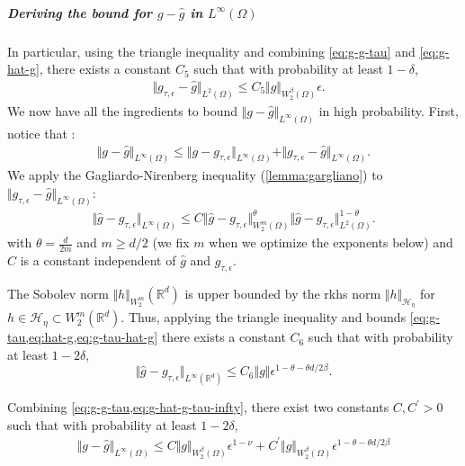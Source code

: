 \subparagraph{Deriving the bound for $g - \hat{g}$ in $L^\infty(\Omega)$}
In particular, using the triangle inequality and combining \cref{eq:g-g-tau} and \cref{eq:g-hat-g}, there exists a constant $C_5$ such that with probability at least $1-\delta$,
\begin{align}
    &\Vert g_{\tau, \epsilon} - \hat g\Vert_{L^2(\Omega)} \leq C_5\Vert g\Vert_{W^\beta_2(\Omega)}\epsilon.\label{eq:g-tau-hat-g}
\end{align}
%
We now have all the ingredients to bound $\Vert g - \hat g\Vert_{L^\infty(\Omega)}$ in high probability. First, notice that :
%
\begin{align}
   \Vert g - \hat g\Vert_{L^\infty(\Omega)} \leq \Vert g - g_{\tau, \epsilon}\Vert_{L^\infty(\Omega)}+ \Vert g_{\tau, \epsilon} - \hat g\Vert_{L^\infty(\Omega)}.
\end{align}
%
We apply the Gagliardo-Nirenberg inequality (\cref{lemma:gargliano}) to $\Vert g_{\tau, \epsilon} - \hat g\Vert_{L^\infty(\Omega)}$:
\begin{align}
\Vert \hat g - g_{\tau, \epsilon}\Vert_{L^\infty(\Omega)}\leq C \Vert \hat g - g_{\tau, \epsilon}\Vert_{W^{m}_2(\Omega)}^\theta \Vert \hat g - g_{\tau, \epsilon}\Vert_{L^2(\Omega)}^{1-\theta}.
\end{align}
with $\theta = \frac{d}{2m}$ and $m \geq d/2$ (we fix $m$ when we optimize the exponents below) and $C$ is a constant independent of $\hat g$ and $g_{\tau, \epsilon}$.

The Sobolev norm $\Vert h \Vert_{W^m_2}(\mathbb R^d)$ is upper bounded by the rkhs norm $\Vert h \Vert_{\mathcal H_\eta}$ for $h\in \mathcal H_\eta \subset W^m_2(\mathbb R^d)$. Thus, applying the triangle inequality and bounds \cref{eq:g-tau,eq:hat-g,eq:g-tau-hat-g} there exists a constant $C_6$  such that with probability at least $1 - 2\delta$,
\begin{equation}\label{eq:g-hat-g-tau-infty}
\Vert \hat g - g_{\tau, \epsilon}\Vert_{L^\infty(\mathbb R^d)}\leq C_6\Vert g\Vert\epsilon^{1 - \theta - \theta d/2\beta}.
\end{equation}

Combining \cref{eq:g-g-tau,eq:g-hat-g-tau-infty}, there exist two constants $C, C^\prime > 0$ such that with probability at least $1 - 2\delta$,
\begin{align}
   \Vert g- \hat g\Vert_{L^\infty(\Omega)} \leq C\Vert g\Vert_{W^\beta_2(\Omega)} \epsilon^{1-\nu} + C^\prime\Vert g\Vert_{W^\beta_2(\Omega)}\epsilon^{1- \theta - \theta d/2\beta}
\end{align}

